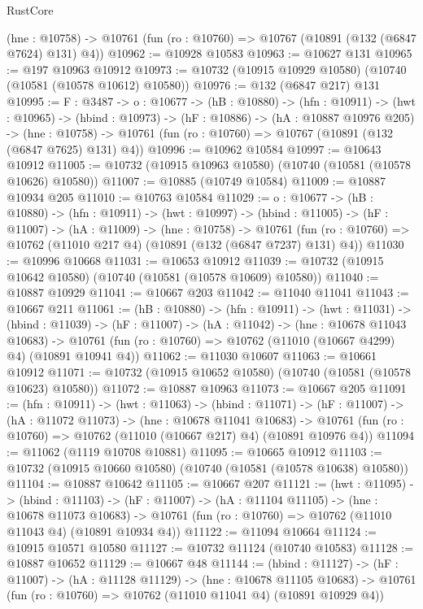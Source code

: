 \begin{lexlean}{RustCore}
\begin{coremodule}
  (hne : @10758) -> @10761 (fun (ro : @10760) => @10767 (@10891 (@132 (@6847 @7624) @131) @4))
@10962 := @10928 @10583
@10963 := @10627 @131
@10965 := @197 @10963 @10912
@10973 := @10732 (@10915 @10929 @10580) (@10740 (@10581 (@10578 @10612) @10580))
@10976 := @132 (@6847 @217) @131
@10995 := {F : @3487} ->
  {o : @10677} ->
  (hB : @10880) ->
  (hfn : @10911) ->
  (hwt : @10965) ->
  (hbind : @10973) ->
  (hF : @10886) ->
  (hA : @10887 @10976 @205) ->
  (hne : @10758) -> @10761 (fun (ro : @10760) => @10767 (@10891 (@132 (@6847 @7625) @131) @4))
@10996 := @10962 @10584
@10997 := @10643 @10912
@11005 := @10732 (@10915 @10963 @10580) (@10740 (@10581 (@10578 @10626) @10580))
@11007 := @10885 (@10749 @10584)
@11009 := @10887 @10934 @205
@11010 := @10763 @10584
@11029 := {o : @10677} ->
  (hB : @10880) ->
  (hfn : @10911) ->
  (hwt : @10997) ->
  (hbind : @11005) ->
  (hF : @11007) ->
  (hA : @11009) ->
  (hne : @10758) ->
  @10761 (fun (ro : @10760) => @10762 (@11010 @217 @4) (@10891 (@132 (@6847 @7237) @131) @4))
@11030 := @10996 @10668
@11031 := @10653 @10912
@11039 := @10732 (@10915 @10642 @10580) (@10740 (@10581 (@10578 @10609) @10580))
@11040 := @10887 @10929
@11041 := @10667 @203
@11042 := @11040 @11041
@11043 := @10667 @211
@11061 := (hB : @10880) ->
  (hfn : @10911) ->
  (hwt : @11031) ->
  (hbind : @11039) ->
  (hF : @11007) ->
  (hA : @11042) ->
  (hne : @10678 @11043 @10683) ->
  @10761 (fun (ro : @10760) => @10762 (@11010 (@10667 @4299) @4) (@10891 @10941 @4))
@11062 := @11030 @10607
@11063 := @10661 @10912
@11071 := @10732 (@10915 @10652 @10580) (@10740 (@10581 (@10578 @10623) @10580))
@11072 := @10887 @10963
@11073 := @10667 @205
@11091 := (hfn : @10911) ->
  (hwt : @11063) ->
  (hbind : @11071) ->
  (hF : @11007) ->
  (hA : @11072 @11073) ->
  (hne : @10678 @11041 @10683) ->
  @10761 (fun (ro : @10760) => @10762 (@11010 (@10667 @217) @4) (@10891 @10976 @4))
@11094 := @11062 (@1119 @10708 @10881)
@11095 := @10665 @10912
@11103 := @10732 (@10915 @10660 @10580) (@10740 (@10581 (@10578 @10638) @10580))
@11104 := @10887 @10642
@11105 := @10667 @207
@11121 := (hwt : @11095) ->
  (hbind : @11103) ->
  (hF : @11007) ->
  (hA : @11104 @11105) ->
  (hne : @10678 @11073 @10683) ->
  @10761 (fun (ro : @10760) => @10762 (@11010 @11043 @4) (@10891 @10934 @4))
@11122 := @11094 @10664
@11124 := @10915 @10571 @10580
@11127 := @10732 @11124 (@10740 @10583)
@11128 := @10887 @10652
@11129 := @10667 @48
@11144 := (hbind : @11127) ->
  (hF : @11007) ->
  (hA : @11128 @11129) ->
  (hne : @10678 @11105 @10683) ->
  @10761 (fun (ro : @10760) => @10762 (@11010 @11041 @4) (@10891 @10929 @4))

\end{coremodule}
\end{lexlean}
